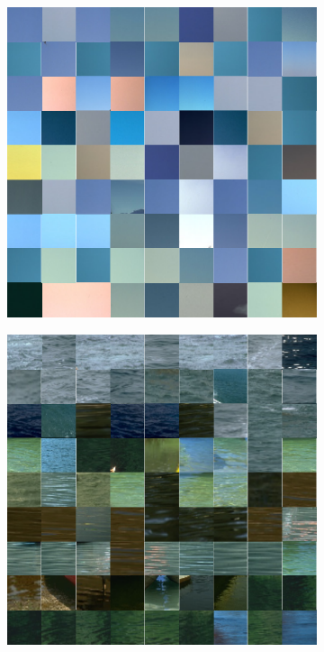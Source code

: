 \begin{figure}[!ht]
\begin{subfigure}[b]{.32\textwidth}
        \caption{}
    \end{subfigure}
    \begin{subfigure}[b]{.32\textwidth}
        \centering
        \includegraphics[width=\linewidth]{figures/tsne_d.pdf}
        \caption{}
    \end{subfigure}
    \begin{subfigure}[b]{.32\textwidth}
        \centering
        \includegraphics[width=\linewidth]{figures/tsne_e.pdf}

\end{subfigure}
\end{figure}
